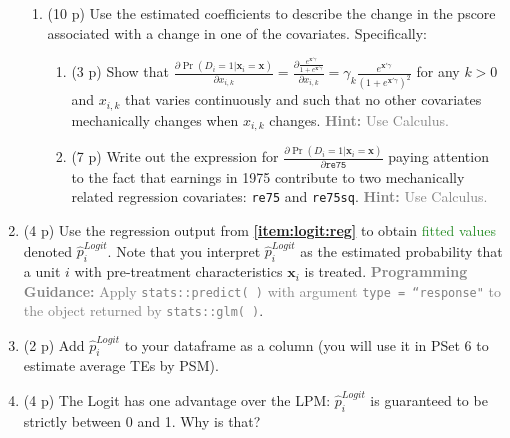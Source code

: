 \documentclass{article}
\begin{document}
\begin{enumerate}[label=\textbf{Q\arabic{enumi}}.,ref=Q\arabic{enumi}, wide=0pt, itemsep=0em, topsep=5pt, labelindent=0pt, resume]
\begin{enumerate}
\item (10 p) Use the estimated coefficients to describe the change in the pscore associated with a change in one of the covariates. Specifically:
\begin{enumerate}
\item (3 p) Show that $\frac{\partial \Pr(D_i=1|\mathbf{x}_{i}=\mathbf{x})}{\partial x_{i,k}}=\frac{\partial \frac{e^{\mathbf{x}'\gamma}}{1+ e^{\mathbf{x}'\gamma}}}{\partial x_{i,k}}= \gamma_k \frac{e^{\mathbf{x}'\gamma}}{(1+e^{\mathbf{x}'\gamma})^2}$ for any $k >0$ and $x_{i,k}$ that varies continuously and such that no other covariates mechanically changes when $x_{i,k}$ changes. \textcolor{gray}{\textbf{Hint:} Use Calculus.}\label{item:logit:partial}
\item (7 p) Write out the expression for $\frac{\partial \Pr(D_i=1|\mathbf{x}_{i}=\mathbf{x})}{\partial \texttt{re75}}$ paying attention to the fact that earnings in 1975 contribute to two mechanically related regression covariates: \texttt{re75} and \texttt{re75sq}. \textcolor{gray}{\textbf{Hint:} Use Calculus.}\label{item:logit:delta-pscore-re75}
\end{enumerate} 
\end{enumerate} 
\item (4 p) Use the regression output from \textbf{\ref{item:logit:reg}} to obtain \textcolor{ForestGreen}{fitted values} denoted $\hat{p}_i^{Logit}$. Note that you interpret $\hat{p}_i^{Logit}$ as the estimated probability that a unit $i$ with pre-treatment characteristics $\mathbf{x}_i$ is treated. \textcolor{gray}{\textbf{Programming Guidance:} Apply \texttt{stats::predict( )} with argument \texttt{type = ``response"} to the object returned by \texttt{stats::glm( )}}.\label{item:logit:fitted}
\item (2 p) Add $\hat{p}_i^{Logit}$ to your dataframe as a column (you will use it in PSet 6 to estimate average TEs by PSM).
\item (4 p) The Logit has one advantage over the LPM: $\hat{p}_i^{Logit}$ is guaranteed to be strictly between 0 and 1. Why is that?
\end{enumerate}
\end{document}
